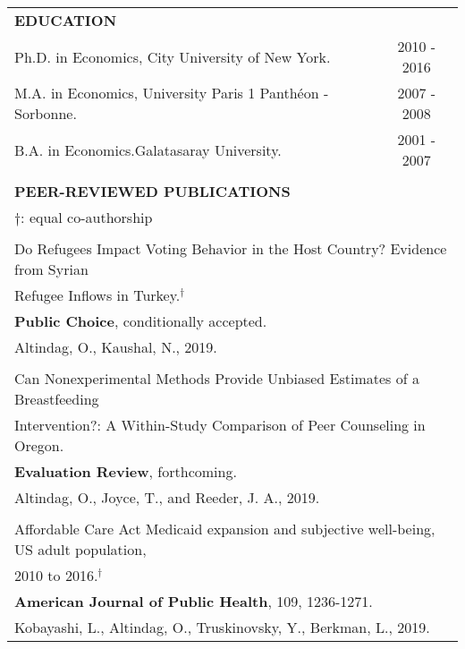 \documentclass[12 pt]{article}
\begin{document}
\begin{longtable}{ccccc}
\multicolumn{5}{l}{\textbf{EDUCATION}}\\[2 pt]
  \multicolumn{4}{l}{Ph.D. in Economics, City University of New York.}  & \multicolumn{1}{c}{2010 - 2016}      \\
    \multicolumn{4}{l}{M.A. in Economics, University Paris 1 Panth\'{e}on - Sorbonne. } 
    & \multicolumn{1}{c}{2007 - 2008}    \\
\multicolumn{4}{l}{B.A. in Economics.Galatasaray University.}  & \multicolumn{1}{c}{2001 - 2007} \\
\\

\multicolumn{5}{l}{\textbf{PEER-REVIEWED PUBLICATIONS }} \\ 
 \multicolumn{5}{l}{\footnotesize{$\dagger$: equal co-authorship}} \\
 \\



   \multicolumn{5}{l}{Do Refugees Impact Voting Behavior in the Host Country? Evidence from Syrian} \\
    \multicolumn{5}{l}{Refugee Inflows in Turkey.$^{\dagger}$} \\
     \multicolumn{5}{l}{\textbf{Public Choice}, conditionally accepted.} \\  
 \multicolumn{5}{l}{Altindag, O., Kaushal, N., 2019.} \\
\\

   \multicolumn{5}{l}{Can Nonexperimental Methods Provide Unbiased Estimates of a Breastfeeding} \\
  \multicolumn{5}{l}{Intervention?: A Within-Study Comparison of Peer Counseling in Oregon. } \\
    \multicolumn{5}{l}{\textbf{Evaluation Review}, forthcoming.} \\
 \multicolumn{5}{l}{Altindag, O., Joyce, T., and Reeder, J. A., 2019.} \\



 \\ 

  \multicolumn{5}{l}{Affordable Care Act Medicaid expansion and subjective well-being, US adult population, } \\
    \multicolumn{5}{l}{2010 to 2016.$^{\dagger}$} \\
   \multicolumn{5}{l}{\textbf{American Journal of Public Health}, 109, 1236-1271.} \\
   \multicolumn{5}{l}{Kobayashi, L., Altindag, O., Truskinovsky, Y., Berkman, L., 2019.}  \\


\end{longtable}
\end{document}
